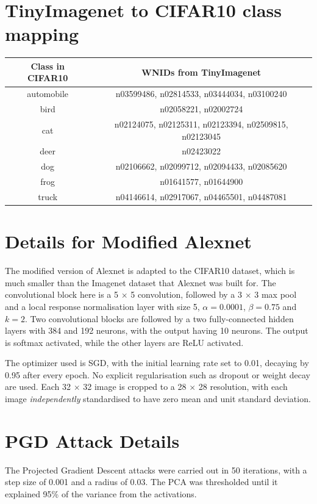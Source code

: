 \documentclass{article}
\begin{document}
    \appendix
    
    \section{TinyImagenet to CIFAR10 class mapping}
        \begin{tabular}{|c|c|}
            \hline
            Class in CIFAR10 & WNIDs from TinyImagenet \\
            \hline
            automobile & n03599486, n02814533, n03444034, n03100240 \\
            \hline
            bird & n02058221, n02002724 \\
            \hline
            cat & n02124075, n02125311, n02123394, n02509815, n02123045 \\
            \hline
            deer & n02423022 \\
            \hline
            dog & n02106662, n02099712, n02094433, n02085620 \\
            \hline
            frog & n01641577, n01644900 \\
            \hline
            truck & n04146614, n02917067, n04465501, n04487081 \\
            \hline
        \end{tabular}
    \section{Details for Modified Alexnet}
        The modified version of Alexnet is adapted to the CIFAR10 dataset, which is much smaller than the Imagenet dataset that Alexnet was built for. The convolutional block here is a 5 $\times$ 5 convolution, followed by a 3 $\times$ 3 max pool and a local response normalisation layer with size 5, $\alpha=0.0001$, $\beta=0.75$ and $k=2$. Two convolutional blocks are followed by a two fully-connected hidden layers with 384 and 192 neurons, with the output having 10 neurons. The output is softmax activated, while the other layers are ReLU activated.

        The optimizer used is SGD, with the initial learning rate set to 0.01, decaying by 0.95 after every epoch. No explicit regularisation such as dropout or weight decay are used. Each 32 $\times$ 32 image is cropped to a 28 $\times$ 28 resolution, with each image \textit{independently} standardised to have zero mean and unit standard deviation.

    \section{PGD Attack Details}
        The Projected Gradient Descent attacks were carried out in 50 iterations, with a step size of 0.001 and a radius of 0.03. The PCA was thresholded until it explained 95\% of the variance from the activations. 
\end{document}
